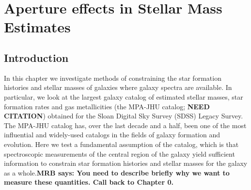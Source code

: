 \chapter{Aperture effects in Stellar Mass Estimates}

\label{ch:acm}
\newpage

\section{Introduction}

In this chapter we investigate methods of constraining the star formation histories and stellar masses of galaxies where galaxy spectra are available. In particular, we look at the largest galaxy catalog of estimated stellar masses, star formation rates and gas metallicities (the MPA-JHU catalog; {\bf NEED CITATION}) obtained for the Sloan Digital Sky Survey (SDSS) Legacy Survey. The MPA-JHU catalog has, over the last decade and a half, been one of the most influential and widely-used catalogs in the fields of galaxy formation and evolution. Here we test a fundamental assumption of the catalog, which is that spectroscopic measurements of the central region of the galaxy yield sufficient information to constrain star formation histories and stellar masses for the galaxy as a whole.\textbf{MRB says: You need to describe briefly why we want to measure
these quantities. Call back to Chapter 0. }\\


